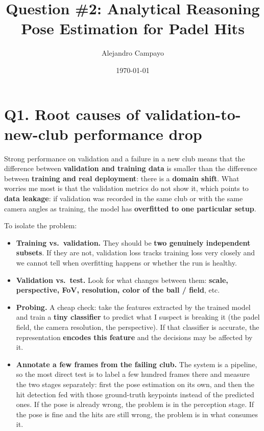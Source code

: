 \documentclass[11pt,a4paper]{article}
\title{Question \#2: Analytical Reasoning \\ Pose Estimation for Padel Hits}
\author{Alejandro Campayo}
\date{\today}
\begin{document}
\maketitle

\section*{Q1. Root causes of validation-to-new-club performance drop}

Strong performance on validation and a failure in a new club means that the difference
between \textbf{validation and training data} is smaller than the difference between
\textbf{training and real deployment}: there is a \textbf{domain shift}. What worries me
most is that the validation metrics do not show it, which points to \textbf{data leakage}:
if validation was recorded in the same club or with the same camera angles as training, the
model has \textbf{overfitted to one particular setup}.

To isolate the problem:

\begin{itemize}
  \item \textbf{Training vs.\ validation.} They should be \textbf{two genuinely independent
    subsets}. If they are not, validation loss tracks training loss very closely and we cannot
    tell when overfitting happens or whether the run is healthy.
  \item \textbf{Validation vs.\ test.} Look for what changes between them: \textbf{scale,
    perspective, FoV, resolution, color of the ball / field}, etc.
  \item \textbf{Probing.} A cheap check: take the features extracted by the trained model and
    train a \textbf{tiny classifier} to predict what I suspect is breaking it (the padel
    field, the camera resolution, the perspective). If that classifier is accurate, the
    representation \textbf{encodes this feature} and the decisions may be affected by it.
  \item \textbf{Annotate a few frames from the failing club.} The system is a pipeline, so
    the most direct test is to label a few hundred frames there and measure the two stages
    separately: first the pose estimation on its own, and then the hit detection fed with those
    ground-truth keypoints instead of the predicted ones. If the pose is already wrong, the
    problem is in the perception stage. If the pose is fine and the hits are still wrong, the
    problem is in what consumes it.
\end{itemize}
\end{document}
